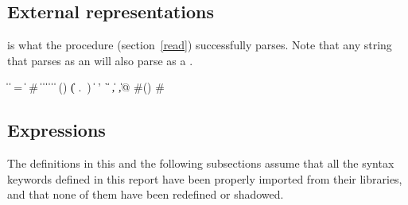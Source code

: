 \subsection{External representations}
\label{datumsyntax}

 is what the  procedure (section~\ref{read})
successfully parses.  Note that any string that parses as an
 will also parse as a .  \label{datum}

\begin{grammar}%
 \:  \| 
\>  \|  =  \|  \#
 \:  \| 
\>  \|  \|  \|   \| 
 \: 
 \:  \| 
 \: () \| ( .\ )
\>    \| 
 \:  
 \: ' \| ` \| , \| ,@
 \: \#()
 \: \#  %
\end{grammar}


\subsection{Expressions}

The definitions in this and the following subsections assume that all
the syntax keywords defined in this report have been properly imported
from their libraries, and that none of them have been redefined or shadowed.

